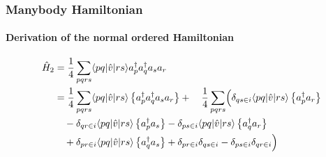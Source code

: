 \begin{frame}[fragile]
    \frametitle{Manybody Hamiltonian}
    \framesubtitle{Derivation of the normal ordered Hamiltonian}

    \begin{align*}
    \hat{H}_2 &= \frac{1}{4} \sum_{pqrs} \langle pq |\hat{v}|rs\rangle a^\dagger_p a^\dagger_q a_s  a_r \notag \\
        &= \frac{1}{4} \sum_{pqrs} \langle pq |\hat{v}|rs\rangle \left\{a^\dagger_p a^\dagger_q a_s  a_r\right\} 
        + \quad \frac{1}{4} \sum_{pqrs} \Bigl( 
            \delta_{qs\in i} \langle pq |\hat{v}|rs\rangle \left\{ a^\dagger_p a_r\right\} \notag \\
        & \quad - \delta_{qr \in i} \langle pq |\hat{v}|rs\rangle \left\{a^\dagger_p a_s\right\}
            - \delta_{ps \in i}\langle pq |\hat{v}|rs\rangle \left\{a^\dagger_q a_r\right\} \notag \\
        & \quad + \delta_{pr \in i} \langle pq |\hat{v}|rs\rangle \left\{a^\dagger_q a_s\right\}
            + \delta_{pr \in i} \delta_{qs \in i}
            - \delta_{ps \in i} \delta_{qr \in i} \Bigr) \notag \\
    \end{align*}

\end{frame}
